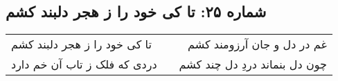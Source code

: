 \begin{center}
\section*{شماره ۲۵: تا کی خود را ز هجر دلبند کشم}
\label{sec:025}
\begin{longtable}{l p{0.5cm} r}
تا کی خود را ز هجر دلبند کشم
&&
غم در دل و جان آرزومند کشم
\\
دردی که فلک ز تاب آن خم دارد
&&
چون دل بنماند دردِ دل چند کشم
\\
\end{longtable}
\end{center}
